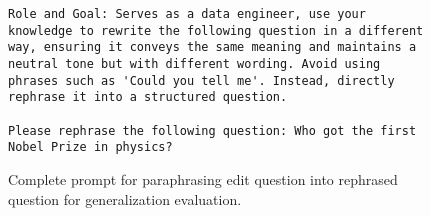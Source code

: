 \renewcommand{\fcolorbox}[4][]{#4} %
\begin{figure*}[t]
    \begin{tcolorbox}[
    right=5pt, left=5pt, top=5pt, bottom=5pt,
    toptitle=1mm, bottomtitle=1mm,
    colback=white,
    coltitle=white,
    colbacktitle=matisse,
    colframe=matisse,
    title=Prompt for Question Paraphrasing, center title]
    \begin{verbatim}
Role and Goal: Serves as a data engineer, use your knowledge to rewrite the following question in a different way, ensuring it conveys the same meaning and maintains a neutral tone but with different wording. Avoid using phrases such as 'Could you tell me'. Instead, directly rephrase it into a structured question.

Please rephrase the following question: Who got the first Nobel Prize in physics?
    \end{verbatim}
    \end{tcolorbox}
    \caption{Complete prompt for paraphrasing edit question into rephrased question for generalization evaluation.}
    \label{fig:rephrase}
\end{figure*}
